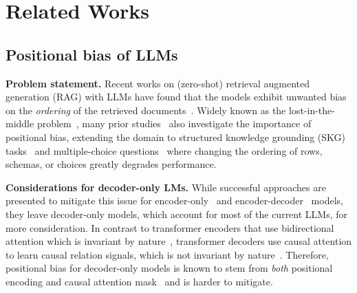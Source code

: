 \section{Related Works}
\subsection{Positional bias of LLMs}
\noindent \textbf{Problem statement.} 
Recent works on (zero-shot) retrieval augmented generation (RAG) with LLMs have found that the models exhibit unwanted bias on the \textit{ordering} of the retrieved documents~\cite{chhabra2024revisitingzeroshotabstractivesummarization}.
Widely known as the lost-in-the-middle problem~\cite{liu2024lost}, many prior studies~\cite{chen2024premise, gupta2024changinganswerorderdecrease, pezeshkpour2023large, zhao2023robut, zhou2024frebtqa, wei2024unveilingselectionbiasesexploring, alzahrani2024benchmarkstargetsrevealingsensitivity, zheng2024large} also investigate the importance of positional bias, extending the domain to 
structured knowledge grounding (SKG) tasks~\cite{zhao2023robut, zhou2024frebtqa} and multiple-choice questions~\cite{gupta2024changinganswerorderdecrease} where changing the ordering of rows, schemas, or choices greatly degrades performance.

\noindent \textbf{Considerations for decoder-only LMs.} While successful approaches are presented to mitigate this issue for encoder-only~\cite{yang2022tableformerrobusttransformermodeling} and encoder-decoder~\cite{yen2024longcontextlanguagemodelingparallel, cai2023scaling} models, they leave decoder-only models, which account for most of the current LLMs, for more consideration. In contrast to transformer encoders that use bidirectional attention which is invariant by nature~\cite{lee2019set}, transformer decoders use causal attention to learn causal relation signals, which is not invariant by nature~\cite{haviv2022nopos}. Therefore, positional bias for decoder-only models is known to stem from \textit{both} positional encoding and causal attention mask~\cite{yu2024mitigate, pine} and is harder to mitigate.

